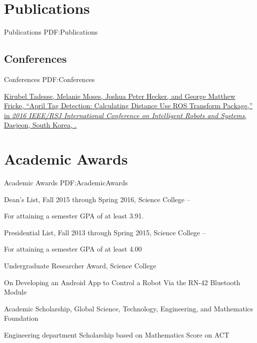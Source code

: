 \documentclass[letterpaper,10pt,oneside]{article}
\begin{document}
\begin{body}
\section
{Publications}
{Publications}
{PDF:Publications}


\BigGap
\subsection
{Conferences}
{Conferences}
{PDF:Conferences}



\Gap
\NumberedItem{{\CharSpace}[1]}
\href{http://www.example.com/my-paper-doi-1}
{\underline{Kirubel Tadesse}, Melanie Moses, Joshua Peter Hecker, and George Matthew Fricke,
``April Tag Detection: Calculating Distance Use ROS Transform Package,''
in \textit{2016 IEEE/RSJ International Conference on Intelligent Robots and Systems},
Daejeon, South Korea,
.}


\section
{Academic Awards}
{Academic Awards}
{PDF:AcademicAwards}


\BulletItem
Dean's List,
Fall 2015 through Spring 2016,
Science College
\hfill
{} --
\begin{detail}
\SubItem
For attaining a semester GPA of at least 3.91.
\end{detail}

\BulletItem
Presidential List,
Fall 2013 through Spring 2015,
Science College
\hfill
{} --
\begin{detail}
\SubItem
For attaining a semester GPA of at least 4.00
\end{detail}

\Gap
\BulletItem
Undergraduate Researcher Award,
Science College
\hfill
{}
\begin{detail}
\SubItem
On Developing an Android App to Control a Robot Via the RN-42 Bluetooth Module
\end{detail}

\Gap
\BulletItem
Academic Scholarship,
\hfill
{}
\newline
Global Science, Technology, Engineering, and Mathematics Foundation
\begin{detail}
\SubItem
Engineering department Scholarship based on Mathematics Score on ACT
\end{detail}


\end{body}
\end{document}
